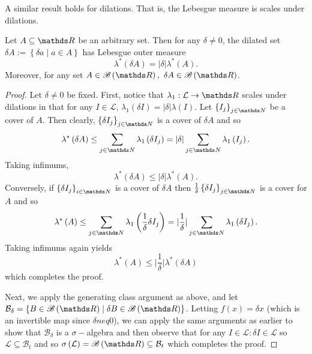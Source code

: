 A similar result holds for dilations. That is, the Lebesgue measure
is scales under dilations.
\begin{lem}
\label{lem:outerMeasureScales}Let $A\subseteq\R$ be an arbitrary
set. Then for any $\delta\neq0$, the dilated set $\delta A:=\left\{ \delta a\mid a\in A\right\} $
has Lebesgue outer measure 
\[
\lambda^{*}\left(\delta A\right)=\lvert\delta\rvert\lambda^{*}\left(A\right).
\]
Moreover, for any set $A\in\borel\left(\R\right),$ $\delta A\in\borel\left(\R\right)$.
\end{lem}

\begin{proof}
Let $\delta\neq0$ be fixed. First, notice that $\lambda_{1}:\mathcal{L}\to\R$
scales under dilations in that for any $I\in\mathcal{L}$, $\lambda_{1}\left(\delta I\right)=\lvert\delta\rvert\lambda\left(I\right)$.
Let $\left\{ I_{j}\right\} _{j\in\N}$ be a cover of $A$. Then clearly,
$\left\{ \delta I_{j}\right\} _{j\in\N}$ is a cover of $\delta A$
and so 
\[
\lambda^{*}\left(\delta A\right)\leq\sum_{j\in\N}\lambda_{1}\left(\delta I_{j}\right)=\lvert\delta\rvert\sum_{j\in\N}\lambda_{1}\left(I_{j}\right).
\]
Taking infimums,
\[
\lambda^{*}\left(\delta A\right)\leq\lvert\delta\rvert\lambda^{*}\left(A\right).
\]
 Conversely, if $\left\{ \delta I_{j}\right\} _{i\in\N}$ is a cover
of $\delta A$ then $\frac{1}{\delta}\left\{ \delta I_{j}\right\} _{j\in\N}$
is a cover for $A$ and so 
\[
\lambda^{*}\left(A\right)\leq\sum_{j\in\N}\lambda_{1}\left(\frac{1}{\delta}\delta I_{j}\right)=\lvert\frac{1}{\delta}\rvert\sum_{j\in\N}\lambda_{1}\left(\delta I_{j}\right).
\]
Taking infimums again yields 
\[
\lambda^{*}\left(A\right)\leq\lvert\frac{1}{\delta}\rvert\lambda^{*}\left(\delta A\right)
\]
which completes the proof.

Next, we apply the generating class argument as above, and let $\mathcal{B}_{\delta}=\left\{ B\in\borel\left(\R\right)\mid\delta B\in\borel\left(\R\right)\right\} $.
Letting $f\left(x\right)=\delta x$ (which is an invertible map since
$\delta neq0$), we can apply the same arguments as earlier to show
that $\mathcal{B}_{\delta}$ is a $\sigma-$algebra and then observe
that for any $I\in\mathcal{L}:\delta I\in\mathcal{L}$ so $\mathcal{L}\subseteq\mathcal{B}_{t}$
and so $\sigma\left(\mathcal{L}\right)=\borel\left(\R\right)\subseteq\mathcal{B}_{t}$
which completes the proof.
\end{proof}
